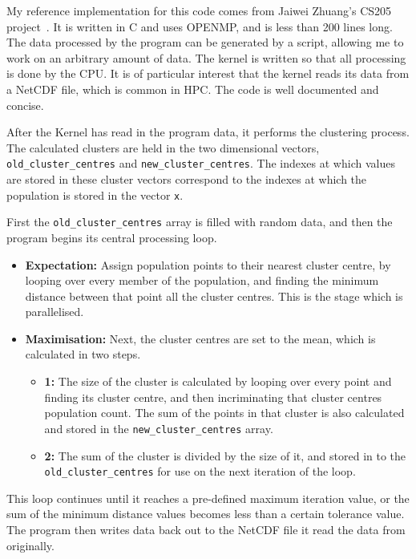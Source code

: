 My reference implementation for this code comes from Jaiwei Zhuang's CS205 project~\cite{CS205}. It is written in C and uses OPENMP, and is less than 200 lines long. The data processed by the program can be generated by a script, allowing me to work on an arbitrary amount of data. The kernel is written so that all processing is done by the CPU\@. It is of particular interest that the kernel reads its data from a NetCDF file, which is common in HPC\@. The code is well documented and concise.

After the Kernel has read in the program data, it performs the clustering process. The calculated clusters are held in the two dimensional vectors, \texttt{old\_cluster\_centres} and \texttt{new\_cluster\_centres}. The indexes at which values are stored in these cluster vectors correspond to the indexes at which the population is stored in the vector \texttt{x}.

First the \texttt{old\_cluster\_centres} array is filled with random data, and then the program begins its central processing loop.
\begin{itemize}
  \item \textbf{Expectation:} Assign population points to their nearest cluster centre, by looping over every member of the population, and finding the minimum distance between that point all the cluster centres. This is the stage which is parallelised.
  \item \textbf{Maximisation:} Next, the cluster centres are set to the mean, which is calculated in two steps.
  \begin{itemize}
    \item \textbf{1:} The size of the cluster is calculated by looping over every point and finding its cluster centre, and then incriminating that cluster centres population count. The sum of the points in that cluster is also calculated and stored in the \texttt{new\_cluster\_centres} array.
   \item \textbf{2:} The sum of the cluster is divided by the size of it, and stored in to the \texttt{old\_cluster\_centres} for use on the next iteration of the loop.
   \end{itemize}
\end{itemize}
This loop continues until it reaches a pre-defined maximum iteration value, or the sum of the minimum distance values becomes less than a certain tolerance value. The program then writes data back out to the NetCDF file it read the data from originally.

